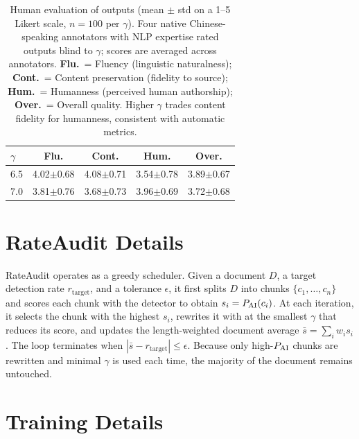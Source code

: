 \begin{table}[t]
\centering
\small
\begin{tabular}{l cccc}
\toprule
$\gamma$ & \textbf{Flu.} & \textbf{Cont.} & \textbf{Hum.} & \textbf{Over.} \\
\midrule
6.5 & 4.02\tiny{$\pm$0.68} & 4.08\tiny{$\pm$0.71} & 3.54\tiny{$\pm$0.78} & 3.89\tiny{$\pm$0.67} \\
7.0 & 3.81\tiny{$\pm$0.76} & 3.68\tiny{$\pm$0.73} & 3.96\tiny{$\pm$0.69} & 3.72\tiny{$\pm$0.68} \\
\bottomrule
\end{tabular}
\caption{Human evaluation of \styleshield{} outputs (mean $\pm$ std on a 1--5 Likert scale, $n{=}100$ per $\gamma$).
Four native Chinese-speaking annotators with NLP expertise rated outputs blind to $\gamma$; scores are averaged across annotators.
\textbf{Flu.}~= Fluency (linguistic naturalness);
\textbf{Cont.}~= Content preservation (fidelity to source);
\textbf{Hum.}~= Humanness (perceived human authorship);
\textbf{Over.}~= Overall quality.
Higher $\gamma$ trades content fidelity for humanness, consistent with automatic metrics.}
\label{tab:human_eval}
\end{table}

\section{RateAudit Details}
\label{sec:app_allocator}

RateAudit operates as a greedy scheduler.
Given a document $D$, a target detection rate $r_{\text{target}}$, and a tolerance $\epsilon$, it first splits $D$ into chunks $\{c_1,\ldots,c_n\}$ and scores each chunk with the detector to obtain $s_i = P_{\text{AI}}(c_i)$.
At each iteration, it selects the chunk with the highest $s_i$, rewrites it with \styleshield{} at the smallest $\gamma$ that reduces its score, and updates the length-weighted document average $\bar{s}=\sum_i w_i s_i$.
The loop terminates when $|\bar{s} - r_{\text{target}}| \leq \epsilon$.
Because only high-$P_{\text{AI}}$ chunks are rewritten and minimal $\gamma$ is used each time, the majority of the document remains untouched.

\section{Training Details}
\label{sec:app_training}

